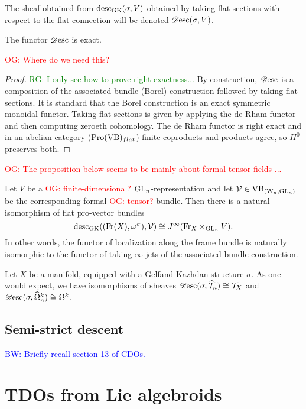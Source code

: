 \documentclass[10pt]{amsart}
\def\brian{\textcolor{blue}{BW: }\textcolor{blue}}
\def\owen{\textcolor{red}{OG: }\textcolor{red}}
\def\ryan{\textcolor{green}{RG: }\textcolor{green}}
\begin{document}
The sheaf obtained from ${\rm desc}_{{\rm GK}}(\sigma, V)$ obtained by taking
flat sections with respect to the flat connection will be denoted
$\mathscr{D}{\rm esc}(\sigma, V)$. 


\begin{lemma}\label{lem:descexact}
The functor $\mathscr{D}{\rm esc}$ is exact.
\end{lemma}

\owen{Where do we need this?}

\begin{proof}
\ryan{I only see how to prove right exactness...}
By construction, $\mathscr{D}{\rm esc}$ is a composition of the associated bundle (Borel) construction followed by taking flat sections.  It is standard that the Borel construction is an exact symmetric monoidal functor.  Taking flat sections is given by applying the de Rham functor and then computing zeroeth cohomology. The de Rham functor is right exact and in an abelian category (${\rm Pro}({\rm VB})_{flat}$) finite coproducts and products agree, so $H^0$ preserves both.
\end{proof}

\owen{The proposition below seems to be mainly about formal tensor fields ...}

\begin{prop}
Let $V$ be a \owen{finite-dimensional?} ${\rm GL}_n$-representation and let $\mathcal{V} \in {\rm VB}_{({{\rm W}_n}, {\rm GL}_n)}$ be the corresponding formal \owen{tensor?} bundle.
Then there is a natural isomorphism of flat pro-vector bundles
\[
{\rm desc}_{\rm GK}(({\rm Fr}(X),\omega^\sigma),\mathcal{V}) \cong J^\infty({\rm Fr}_X \times_{{\rm GL}_n} V).
\]
In other words, the functor of localization along the frame bundle is
naturally isomorphic to the functor of taking $\infty$-jets of the associated bundle construction.
\end{prop} 

\begin{ex}
Let $X$ be a manifold, equipped with a Gelfand-Kazhdan structure $\sigma$. As one would expect, we have isomorphisms of sheaves $\mathscr{D}{\rm esc}( \sigma, \widehat{\mathcal T}_n) \cong \mathcal T_X$ and $\mathscr{D}{\rm esc}( \sigma, \widehat{\Omega}^k_n) \cong \Omega^k$.
\end{ex}


\subsection{Semi-strict descent}  \brian{Briefly recall section 13 of CDOs.}

\section{TDOs from Lie algebroids}\label{sect:FormalLA}
\end{document}
